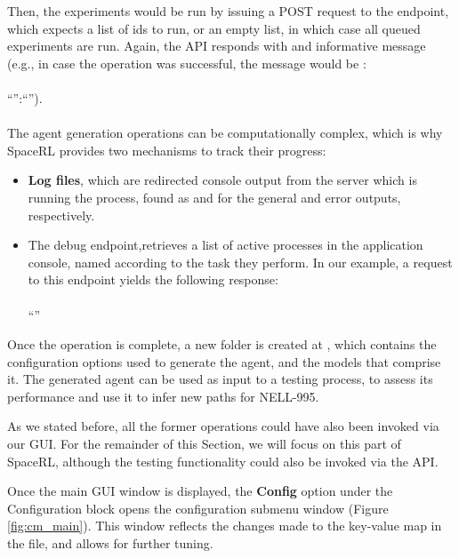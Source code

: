 Then, the experiments would be run by issuing a POST request to the  endpoint, which expects a list of ids to run, or an empty list, in  which case all queued experiments are run. Again, the API responds with and informative message (e.g., in case the operation was successful, the message would be :
\\
\\
``'':``'').
\\
\\
The agent generation operations can be computationally complex, which is why SpaceRL provides two mechanisms to track their progress:
\begin{itemize}
    \item \textbf{Log files}, which are redirected console output from the server which is running the process, found as  and  for the general and error outputs, respectively.
    
    \item The  debug endpoint,retrieves a list of active processes in the application console, named according to the task they perform. In our example, a request to this endpoint yields the following response:
    \\
    \\
    ``''

\end{itemize}

Once the operation is complete, a new folder is created at , which contains the configuration options used to generate the agent, and the models that comprise it.
The generated agent can be used as input to a testing process, to assess its performance and use it to infer new paths for NELL-995.

As we stated before, all the former operations could have also been invoked via our GUI. For the remainder of this Section, we will focus on this part of SpaceRL, although the testing functionality could also be invoked via the API.

Once the main GUI window is displayed, the \textbf{Config} option under the Configuration block opens the configuration submenu window (Figure \ref{fig:cm_main}). This window reflects the changes made to the key-value map in the  file, and allows for further tuning. 

